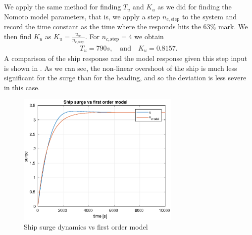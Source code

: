 \subsection{}
We apply the same method for finding $T_u$ and $K_u$ as we did for finding the Nomoto model parameters, that is, we apply a step $n_{c,\text{step}}$ to the system and record the time constant as the time where the responds hits the $63 \%$ mark. We then find $K_u$ as $K_u = \frac{u_{\infty}}{n_{c,\text{step}}}$. For $n_{c,\text{step}} = 4$ we obtain
\begin{equation}\begin{aligned}
T_u = 790s, \quad \text{and} \quad K_u = 0.8157.
\end{aligned}\end{equation}
A comparison of the ship response and the model response given this step input is shown in . As we can see, the non-linear overshoot of the ship is much less significant for the surge than for the heading, and so the deviation is less severe in this case.
\begin{figure}[H]
\centering
\includegraphics[width=0.7\textwidth]{surge_boi}
\caption{Ship surge dynamics vs first order model}
\label{fig:surge_boi}
\end{figure}

